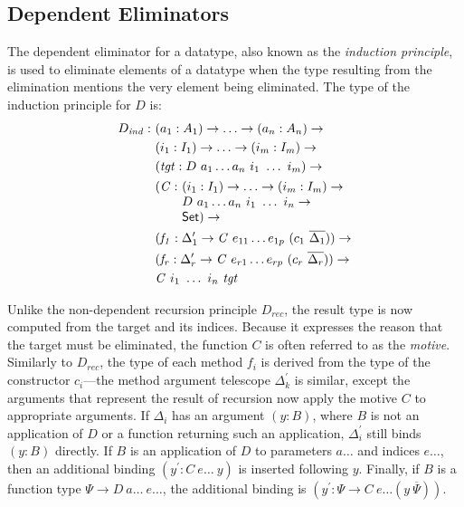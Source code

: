 \documentclass[sigplan,10pt]{acmart}
\begin{document}
\subsection{Dependent Eliminators}
\label{sec:sec3.2}

The dependent eliminator for a datatype, also known as the \emph{induction principle}, is used to eliminate elements of a datatype when the type resulting from the elimination mentions the very element being eliminated. The type of the induction principle for $D$ is:
\begin{align*}
D_{\mathit{ind}} :\ & (a_1 : A_1) \to \ldots \to (a_n : A_n) \to\\
& (i_1 : I_1) \to \ldots \to (i_m : I_m) \to\\
& (\mathit{tgt} : D\ a_1 \ldots a_n\ i_1\ \ldots\ i_m) \to\\
& \begin{array}{@{}l@{}l}(\mathit{C} :\ & (i_1 : I_1) \to \ldots \to (i_m : I_m) \to\\  & D\ a_1 \ldots a_n\ i_1\ \ldots\ i_n \to\\ &\SET{})\to\end{array} \\
& (\mathit{f_1} : \Delta_1^\prime \to \mathit{C}\ e_{11} \ldots e_{1p}\ (c_1\ \overline{\Delta_1})) \to \\
& (\mathit{f_r} : \Delta_r^\prime \to \mathit{C}\ e_{r1} \ldots e_{rp}\ (c_r\ \overline{\Delta_r})) \to \\
& \mathit{C}\ i_1\ \ldots\ i_n\ \mathit{tgt}
\end{align*}

Unlike the non-dependent recursion principle $D_{\mathit{rec}}$, the result type is now computed from the target and its indices.
Because it expresses the reason that the target must be eliminated, the function $C$ is often referred to as the \emph{motive}.
Similarly to  $D_{\mathit{rec}}$, the type of each method $f_i$ is derived from the type of the constructor $c_i$---the method argument telescope $\Delta_k^\prime$ is similar, except the arguments that represent the result of recursion now apply the motive $C$ to appropriate arguments.
If $\Delta_i$ has an argument $(y : B)$, where $B$ is not an application of $D$ or a function returning such an application, $\Delta_i^\prime$ still binds $(y : B)$ directly.
If $B$ is an application of $D$ to parameters $a\ldots$ and indices $e\ldots$, then an additional binding $(y^\prime : C\ e\ldots\ y)$ is inserted following $y$.
Finally, if $B$ is a function type $\Psi \to D\ a\ldots\ e\ldots$, the additional binding is $(y^\prime : \Psi \to C\ e\ldots (y\ \overline{\Psi}))$. 
\end{document}
